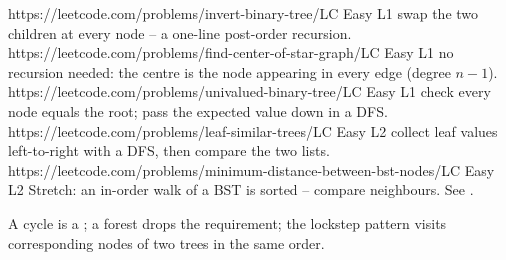\begin{practiceset}
    {https://leetcode.com/problems/invert-binary-tree/}{LC Easy L1}
    {swap the two children at every node -- a one-line post-order recursion.}
    {https://leetcode.com/problems/find-center-of-star-graph/}{LC Easy L1}
    {no recursion needed: the centre is the node appearing in every edge (degree $n{-}1$).}
    {https://leetcode.com/problems/univalued-binary-tree/}{LC Easy L1}
    {check every node equals the root; pass the expected value down in a DFS.}
    {https://leetcode.com/problems/leaf-similar-trees/}{LC Easy L2}
    {collect leaf values left-to-right with a DFS, then compare the two lists.}
    {https://leetcode.com/problems/minimum-distance-between-bst-nodes/}{LC Easy L2}
    {Stretch: an in-order walk of a BST is sorted -- compare neighbours. See .}
\end{practiceset}

\begin{recallbox}
A cycle is a \underline{\hspace{1.0cm}}; a forest drops the
\underline{\hspace{1.0cm}} requirement; the lockstep pattern visits corresponding
nodes of two trees in the same order.
\end{recallbox}
